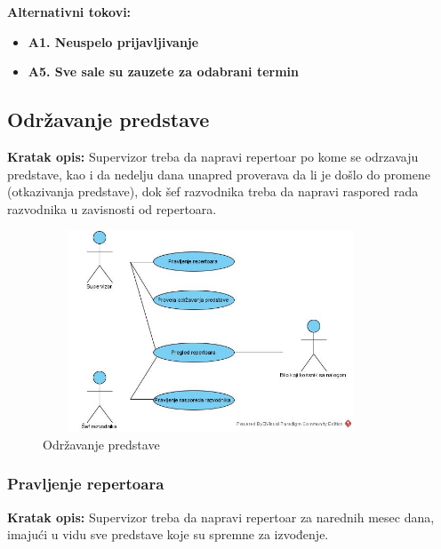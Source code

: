 \documentclass[a4paper]{article}
\begin{document}
\noindent\textbf{Alternativni tokovi:} 
\begin{itemize}
 \item \textbf{A1. Neuspelo prijavljivanje} 
       \item \textbf{A5. Sve sale su zauzete za odabrani termin} 
\end{itemize}

\subsection{Održavanje predstave}
  \item \textbf{Kratak opis:} Supervizor treba da napravi repertoar po kome se odrzavaju predstave, kao i da nedelju dana unapred proverava da li je došlo do promene (otkazivanja predstave), dok šef razvodnika treba da napravi raspored rada razvodnika u zavisnosti od repertoara. 
  
  \begin{figure}[H]
  \begin{center}
      \includegraphics[width=100mm,height=60mm]{../diagrams/usecase_odrzavanje_predstave.jpg}
  \end{center}
  \caption{Održavanje predstave}
  \label{usecase_prodaja_karata}
\end{figure}


\subsubsection{Pravljenje repertoara} 
\noindent\textbf{Kratak opis:} Supervizor treba da napravi repertoar za narednih mesec dana, imajući u vidu sve predstave koje su spremne za izvođenje.
\end{document}
